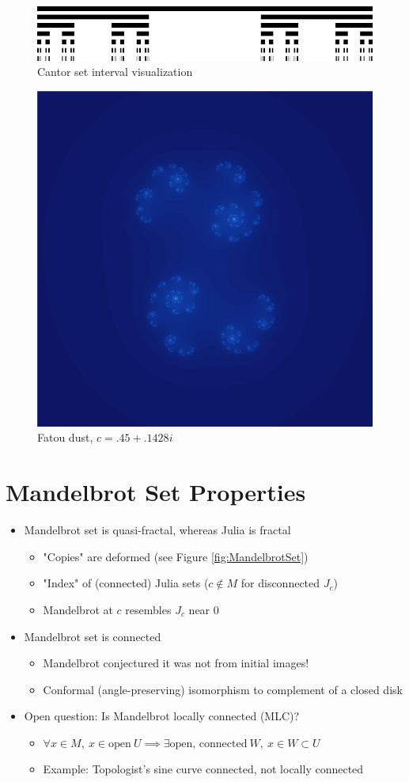 \documentclass{article}
\begin{document}
\begin{figure}[!h]
    \includegraphics[width=\linewidth]{images/Cantor_set_in_seven_iterations.png}
    \caption{Cantor set interval visualization \cite{Cantor}}%
\end{figure}

\begin{figure}[!htbp]
    \centering
    \includegraphics[width=.4\linewidth]{images/julia_fatou_dust_c_45_1428.png}
    \caption{Fatou dust, $c = .45 + .1428i$}%
\end{figure}
 
\section{Mandelbrot Set Properties}

\begin{itemize}
    \item Mandelbrot set is quasi-fractal, whereas Julia is fractal
    \begin{itemize}
        \item "Copies" are deformed (see Figure \ref{fig:MandelbrotSet})
        \item "Index" of (connected) Julia sets ($c \not \in M$ for disconnected $J_c$)
        \item Mandelbrot at $c$ resembles $J_c$ near $0$
    \end{itemize}

    \item Mandelbrot set is connected
    \begin{itemize}
        \item Mandelbrot conjectured it was not from initial images!
        \item Conformal (angle-preserving) isomorphism to complement of a closed disk
    \end{itemize}

    \item Open question: Is Mandelbrot locally connected (MLC)?
    \begin{itemize}
        \item $\forall x \in M,\ x \in \textrm{open}\ U  \implies \exists \text{open, connected}\ W,\ x \in W \subset U$
        \item Example: Topologist's sine curve connected, not locally connected
    \end{itemize}
\end{itemize}
\end{document}
